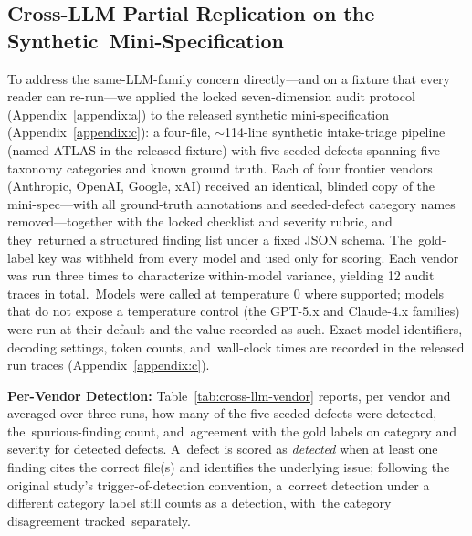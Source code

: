 \documentclass[software,article,accept,pdftex,oneauthor]{Definitions/mdpi}
\def\hl#1{#1}
\begin{document}
\subsection{Cross-LLM Partial Replication on the Synthetic~Mini-Specification}
\label{subsec:cross-llm}

To address the same-LLM-family concern directly---and on a fixture that every reader can re-run---we applied the locked seven-dimension audit protocol (Appendix~\ref{appendix:a}) to the released synthetic mini-specification (Appendix~\ref{appendix:c}): a four-file, $\sim$114-line synthetic intake-triage pipeline (named ATLAS in the released fixture) with five seeded defects spanning five taxonomy categories and known ground truth. Each of four frontier vendors (Anthropic, OpenAI, Google, xAI) received an identical, blinded copy of the mini-spec---with all ground-truth annotations and seeded-defect category names removed---together with the locked checklist and severity rubric, and they~returned a structured finding list under a fixed JSON schema. The~gold-label key was withheld from every model and used only for scoring. Each vendor was run three times to characterize within-model variance, yielding 12 audit traces in total.~Models were called at temperature 0 where supported; models that do not expose a temperature control (the GPT-5.x and Claude-4.x families) were run at their default and the value recorded as such. Exact model identifiers, decoding settings, token counts, and~wall-clock times are recorded in the released run traces (Appendix~\ref{appendix:c}).

\textbf{\hl{Per-Vendor Detection:}} Table~\ref{tab:cross-llm-vendor} reports, per vendor and averaged over three runs, how many of the five seeded defects were detected, the~spurious-finding count, and~agreement with the gold labels on category and severity for detected defects. A~defect is scored as \emph{\hl{detected}} when at least one finding cites the correct file(s) and identifies the underlying issue; following the original study's trigger-of-detection convention, a~correct detection under a different category label still counts as a detection, with~the category disagreement tracked~separately.
\end{document}
